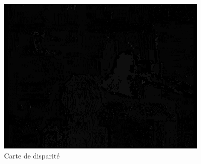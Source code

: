 \documentclass[a4paper]{article}
\begin{document}
\begin{figure}[h]
\begin{center}
	\includegraphics{disparity.png}
\end{center}
\caption{Carte de disparité}
\end{figure}
\end{document}
